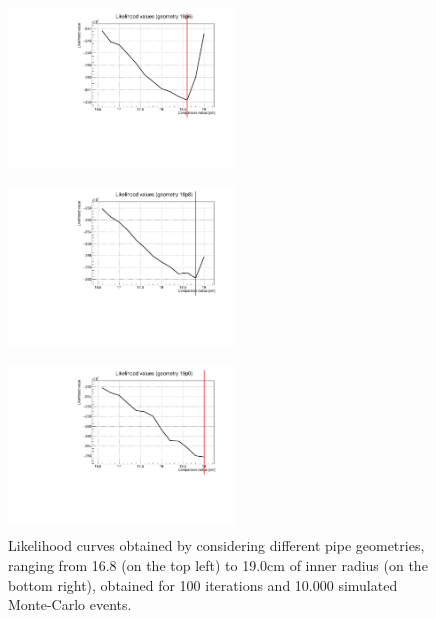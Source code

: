 \documentclass[a4paper, 11pt, twoside, openright]{report}
\begin{document}
\begin{figure}[htbp]
\begin{minipage}[b]{.32\textwidth}
\includegraphics[width=6cm, height=4.6cm]{figs/likelihood100LowStat/likelihood18p6.pdf}
\end{minipage}\hfill
\begin{minipage}[b]{.32\textwidth}
\includegraphics[width=6cm, height=4.6cm]{figs/likelihood100LowStat/likelihood18p8.pdf}
\end{minipage} \hfill
\begin{minipage}[b]{.32\textwidth}
\includegraphics[width=6cm, height=4.6cm]{figs/likelihood100LowStat/likelihood19p0.pdf}
\end{minipage} \hfill
\caption{Likelihood curves obtained by considering different pipe geometries, ranging from 16.8 (on the top left) to 19.0cm of inner radius (on the bottom right), obtained for 100 iterations and 10.000 simulated Monte-Carlo events.}
\label{fig:likelihoods}
\end{figure}
\end{document}
